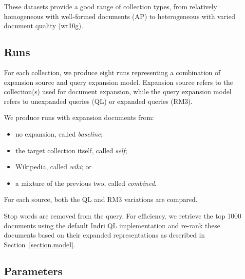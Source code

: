 \documentclass[sigconf]{acmart}
\begin{document}
These datasets provide a good range of collection types, from relatively homogeneous with well-formed documents (AP) to heterogeneous with varied document quality (wt10g).

\subsection{Runs}\label{section.evaluation.runs}

For each collection, we produce eight runs representing a combination of expansion source and query expansion model. Expansion source refers to the collection(s) used for document expansion, while the query expansion model refers to unexpanded queries (QL) or expanded queries (RM3).

We produce runs with expansion documents from:
\begin{itemize}
	\item no expansion, called \textit{baseline};
	\item the target collection itself, called \textit{self};
	\item Wikipedia, called \textit{wiki}; or
	\item a mixture of the previous two, called \textit{combined}.
\end{itemize}

\noindent For each source, both the QL and RM3 variations are compared.

Stop words are removed from the query. For efficiency, we retrieve the top 1000 documents using the default Indri QL implementation and re-rank these documents based on their expanded representations as described in Section~\ref{section.model}.

\subsection{Parameters}\label{section.evaluation.parameters}
\end{document}
